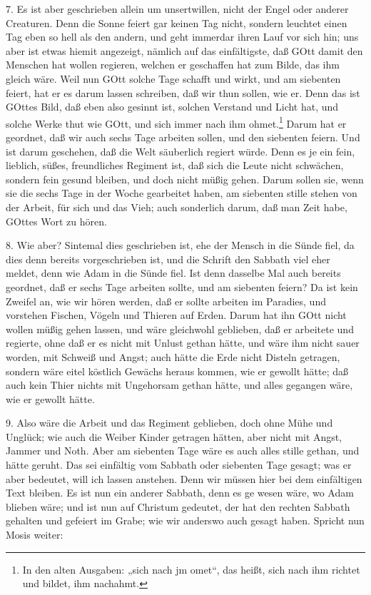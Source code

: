 7. Es ist aber geschrieben allein um unsertwillen, nicht der Engel oder anderer Creaturen. Denn die Sonne feiert gar keinen Tag nicht, sondern leuchtet einen Tag eben so hell als den andern, und geht immerdar ihren Lauf vor sich hin; uns aber ist etwas hiemit angezeigt, nämlich auf das einfältigste, daß GOtt damit den Menschen hat wollen regieren, welchen er geschaffen hat zum Bilde, das ihm gleich wäre. Weil nun GOtt solche Tage schafft und wirkt, und am siebenten feiert, hat er es darum lassen schreiben, daß wir thun sollen, wie er. Denn das ist GOttes Bild, daß eben also gesinnt ist, solchen Verstand und Licht hat, und solche Werke thut wie GOtt, und sich immer nach ihm ohmet.\footnote{In den alten Ausgaben: „sich nach jm omet“, das heißt, sich nach ihm richtet und bildet, ihm nachahmt.} Darum hat er geordnet, daß wir auch sechs Tage arbeiten sollen, und den siebenten feiern. Und ist darum geschehen, daß die Welt säuberlich regiert würde. Denn es je ein fein, lieblich, süßes, freundliches Regiment ist, daß sich die Leute nicht schwächen, sondern fein gesund bleiben, und doch nicht müßig gehen. Darum sollen sie, wenn sie die sechs Tage in der Woche gearbeitet haben, am siebenten stille stehen von der Arbeit, für sich und das Vieh; auch sonderlich darum, daß man Zeit habe, GOttes Wort zu hören.

8. Wie aber? Sintemal dies geschrieben ist, ehe der Mensch in die Sünde fiel, da dies denn bereits vorgeschrieben ist, und die Schrift den Sabbath viel eher meldet, denn wie Adam in die Sünde fiel. Ist denn dasselbe Mal auch bereits geordnet, daß er sechs Tage arbeiten sollte, und am siebenten feiern? Da ist kein Zweifel an, wie wir hören werden, daß er sollte arbeiten im Paradies, und vorstehen Fischen, Vögeln und Thieren auf Erden. Darum hat ihn GOtt nicht wollen müßig gehen lassen, und wäre gleichwohl geblieben, daß er arbeitete und regierte, ohne daß er es nicht mit Unlust gethan hätte, und wäre ihm nicht sauer worden, mit Schweiß und Angst; auch hätte die Erde nicht Disteln getragen, sondern wäre eitel köstlich Gewächs heraus kommen, wie er gewollt hätte; daß auch kein Thier nichts mit Ungehorsam gethan hätte, und alles gegangen wäre, wie er gewollt hätte.

9. Also wäre die Arbeit und das Regiment geblieben, doch ohne Mühe und Unglück; wie auch die Weiber Kinder getragen hätten, aber nicht mit Angst, Jammer und Noth. Aber am siebenten Tage wäre es auch alles stille gethan, und hätte geruht. Das sei einfältig vom Sabbath oder siebenten Tage gesagt; was er aber bedeutet, will ich lassen anstehen. Denn wir müssen hier bei dem einfältigen Text bleiben. Es ist nun ein anderer Sabbath, denn es ge
wesen wäre, wo Adam blieben wäre; und ist nun auf Christum gedeutet, der hat den rechten Sabbath gehalten und gefeiert im Grabe; wie wir anderswo auch gesagt haben. Spricht nun Mosis weiter:

